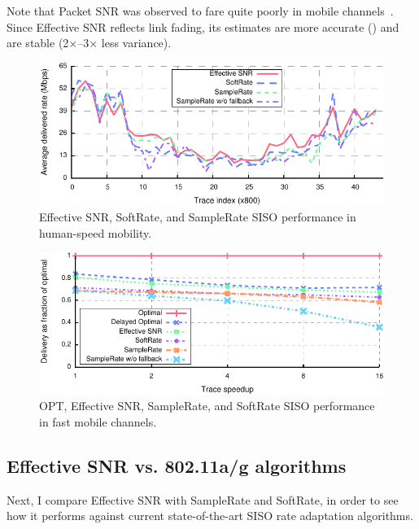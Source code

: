 Note that Packet SNR was observed to fare quite poorly in mobile channels~\cite{Vutukuru_SoftRate}. Since Effective SNR reflects link fading, its estimates are more accurate () and are stable (2$\times$--3$\times$ less variance).


\begin{figure}[t]
      \centering
      \includegraphics[width=\textwidth]{figures/rate/siso_rate_time_all.pdf}
      \caption[SISO algorithm performance in human-speed mobility]{\label{fig:siso_rate_time_opt_eff_sr_so} Effective SNR, SoftRate, and SampleRate SISO performance in human-speed mobility.}
\end{figure}
\begin{figure}[t]
      \centering
      \includegraphics[width=\textwidth]{figures/rate/siso_rate_skip_ratio.pdf}
      \caption[SISO algorithm performance in fast mobile channels]{\label{fig:siso_rate_skip_opt_eff_sr_so} OPT, Effective SNR, SampleRate, and SoftRate SISO performance in fast mobile channels.}
\end{figure}

\subsection{Effective SNR vs. 802.11a/g algorithms}
Next, I compare Effective SNR with SampleRate and SoftRate, in order to see how it performs against current state-of-the-art SISO rate adaptation algorithms.

